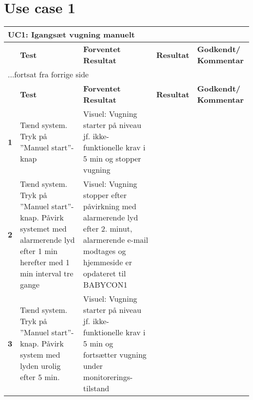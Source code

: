 \section*{Use case 1}
\begin{center}
	\label{accepttest:uc1} 
\begin{longtable}{|p{}|p{}|p{}|p{}|p{}|} %
\hline
\multicolumn{5}{|l|}{\textbf{UC1: Igangsæt vugning manuelt}} \\ \hline
\multicolumn{1}{|c|}{} &
\textbf{Test} &
\textbf{Forventet \newline Resultat} &
\textbf{Resultat} &
\textbf{Godkendt/ \newline Kommentar} \\ \hline 
\endfirsthead

\multicolumn{5}{l}{...fortsat fra forrige side} \\ \hline 
\multicolumn{1}{|c|}{} &
\textbf{Test} &
\textbf{Forventet \newline Resultat} &
\textbf{Resultat} &
\textbf{Godkendt/ \newline Kommentar} \\ \hline 
\endhead



\textbf{1}	&Tænd system. Tryk på ''Manuel start''-knap
			&Visuel: Vugning starter på niveau jf. 
			 ikke-funktionelle krav i 5 min og stopper vugning
			&
			&
			\\\hline

\textbf{2}	&Tænd system. Tryk på ''Manuel start''-knap. 
 			 Påvirk systemet med alarmerende lyd efter 1 
 			 min herefter med 1 min interval tre gange
			&Visuel: Vugning stopper efter påvirkning med 
			 alarmerende lyd efter 2. minut, 
			 alarmerende e-mail modtages og hjemmeside er 
			 opdateret til BABYCON1
			&
			&
			\\\hline
			 
\textbf{3}	&Tænd system. Tryk på ''Manuel start''-knap. 
			 Påvirk system med lyden urolig efter 5 min.
			&Visuel: Vugning starter på niveau jf. 
			 ikke-funktionelle krav i 5 min og fortsætter 
			 vugning under monitorerings-tilstand
			&
			&
			\\\hline

\end{longtable}
\end{center}